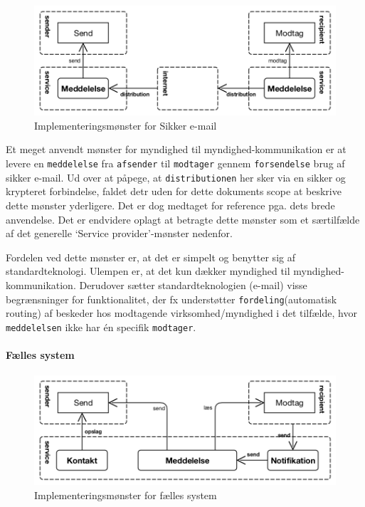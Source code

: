 \begin{figure}
\centering
\includegraphics{figures/send-email.png}
\caption{Implementeringsmønster for Sikker e-mail}
\end{figure}

Et meget anvendt mønster for myndighed til myndighed-kommunikation er at
levere en \texttt{meddelelse} fra \texttt{afsender} til
\texttt{modtager} gennem \texttt{forsendelse} brug af sikker e-mail. Ud
over at påpege, at \texttt{distributionen} her sker via en sikker og
krypteret forbindelse, faldet detr uden for dette dokuments scope at
beskrive dette mønster yderligere. Det er dog medtaget for reference
pga. dets brede anvendelse. Det er endvidere oplagt at betragte dette
mønster som et særtilfælde af det generelle `Service provider'-mønster
nedenfor.

Fordelen ved dette mønster er, at det er simpelt og benytter sig af
standardteknologi. Ulempen er, at det kun dækker myndighed til
myndighed-kommunikation. Derudover sætter standardteknologien (e-mail)
visse begrænsninger for funktionalitet, der fx understøtter
\texttt{fordeling}(automatisk routing) af beskeder hos modtagende
virksomhed/myndighed i det tilfælde, hvor \texttt{meddelelsen} ikke har
én specifik \texttt{modtager}.

\paragraph{Fælles system}\label{fuxe6lles-system}

\begin{figure}
\centering
\includegraphics{figures/send-shared.png}
\caption{Implementeringsmønster for fælles system}
\end{figure}


